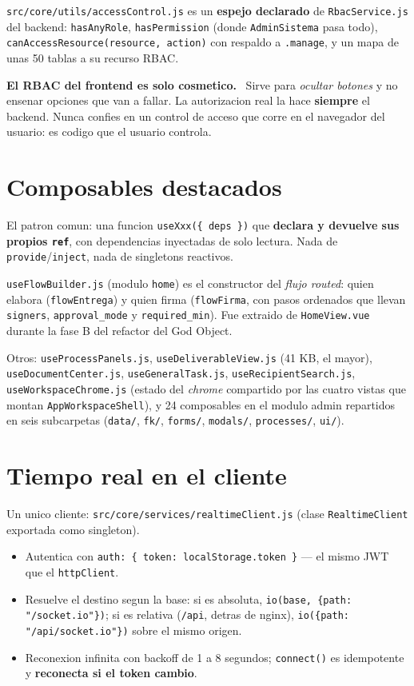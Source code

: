 \documentclass[11pt,a4paper,oneside]{report}
\newenvironment{aviso}[1][Aviso]{%
  \par\medskip
  \colorlet{shadecolor}{orange!14}%
  \begin{shaded}\noindent\textbf{\color{orange!45!black}#1.}\ \ignorespaces}%
  {\end{shaded}\par\medskip}
\newcommand{\rt}[1]{\texttt{#1}}
\begin{document}
\rt{src/core/utils/accessControl.js} es un \textbf{espejo declarado} de \rt{RbacService.js} del
backend: \rt{hasAnyRole}, \rt{hasPermission} (donde \rt{AdminSistema} pasa todo),
\rt{canAccessResource(resource, action)} con respaldo a \rt{.manage}, y un mapa de unas 50
tablas a su recurso RBAC.

\begin{aviso}[El RBAC del frontend es solo cosmetico]
Sirve para \emph{ocultar botones} y no ensenar opciones que van a fallar. La autorizacion real
la hace \textbf{siempre} el backend. Nunca confies en un control de acceso que corre en el
navegador del usuario: es codigo que el usuario controla.
\end{aviso}

\section{Composables destacados}

El patron comun: una funcion \rt{useXxx(\{ deps \})} que \textbf{declara y devuelve sus propios
\rt{ref}}, con dependencias inyectadas de solo lectura. Nada de \rt{provide}/\rt{inject}, nada
de singletons reactivos.

\rt{useFlowBuilder.js} (modulo \rt{home}) es el constructor del \emph{flujo routed}: quien
elabora (\rt{flowEntrega}) y quien firma (\rt{flowFirma}, con pasos ordenados que llevan
\rt{signers}, \rt{approval\_mode} y \rt{required\_min}). Fue extraido de \rt{HomeView.vue}
durante la fase B del refactor del God Object.

Otros: \rt{useProcessPanels.js}, \rt{useDeliverableView.js} (41 KB, el mayor),
\rt{useDocumentCenter.js}, \rt{useGeneralTask.js}, \rt{useRecipientSearch.js},
\rt{useWorkspaceChrome.js} (estado del \emph{chrome} compartido por las cuatro vistas que montan
\rt{AppWorkspaceShell}), y 24 composables en el modulo admin repartidos en seis subcarpetas
(\rt{data/}, \rt{fk/}, \rt{forms/}, \rt{modals/}, \rt{processes/}, \rt{ui/}).

\section{Tiempo real en el cliente}

Un unico cliente: \rt{src/core/services/realtimeClient.js} (clase \rt{RealtimeClient} exportada
como singleton).

\begin{itemize}[leftmargin=1.4em]
  \item Autentica con \rt{auth: \{ token: localStorage.token \}} --- el mismo JWT que el
        \rt{httpClient}.
  \item Resuelve el destino segun la base: si es absoluta, \rt{io(base, \{path: "/socket.io"\})};
        si es relativa (\rt{/api}, detras de nginx), \rt{io(\{path: "/api/socket.io"\})} sobre
        el mismo origen.
  \item Reconexion infinita con backoff de 1 a 8 segundos; \rt{connect()} es idempotente y
        \textbf{reconecta si el token cambio}.
\end{itemize}
\end{document}
